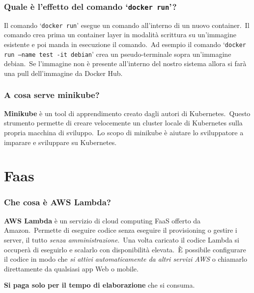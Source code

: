 \documentclass[12pt, a4paper]{article}
\begin{document}
\subsubsection*{Quale è l'effetto del comando `\texttt{docker run}'?}
Il comando `\texttt{docker run}' esegue un comando all'interno di un nuovo container.\
Il comando crea prima un container layer in modalità scrittura su un'immagine esistente e poi manda in esecuzione il comando.\
Ad esempio il comando `\texttt{docker run --name test -it debian}' crea un pseudo-terminale sopra un'immagine debian.\
Se l'immagine non è presente all'interno del nostro sistema allora si farà
una pull dell'immagine da Docker Hub.

\subsubsection*{A cosa serve minikube?}

\textbf{Minikube} è un tool di apprendimento creato dagli autori di Kubernetes.\
Questo strumento permette di creare velocemente un cluster locale di Kubernetes sulla propria macchina di sviluppo.\
Lo scopo di minikube è aiutare lo sviluppatore a imparare e sviluppare su Kubernetes.

\section{Faas}
\subsubsection*{Che cosa è AWS Lambda?}
\textbf{AWS Lambda} è un servizio di cloud computing FaaS offerto da Amazon.\
Permette di eseguire codice senza eseguire il provisioning o gestire i server, il tutto \textit{senza amministrazione}.\
Una volta caricato il codice Lambda si occuperà di eseguirlo e scalarlo con disponibilità elevata.\
È possibile configurare il codice in modo che \textit{si attivi automaticamente da altri servizi AWS} o chiamarlo direttamente da qualsiasi app Web o mobile.\

\textbf{Si paga solo per il tempo di elaborazione} che si consuma.\
\end{document}

